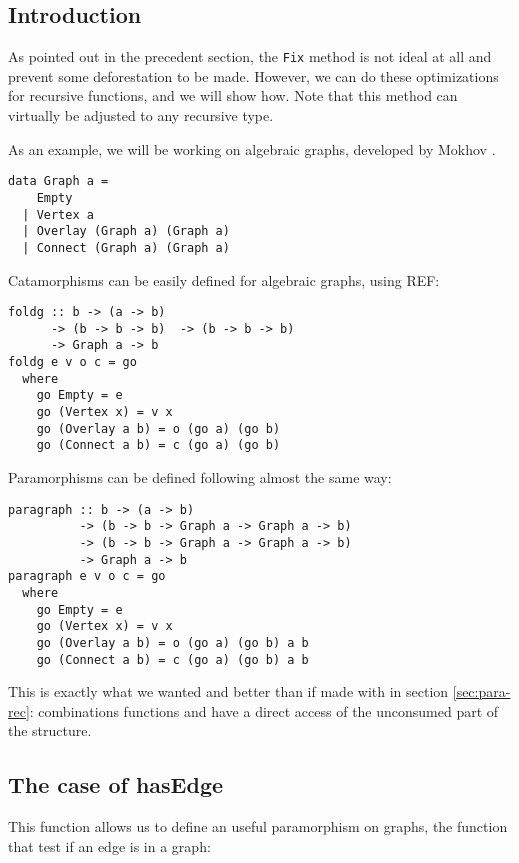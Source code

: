 
\subsection{Introduction}
As pointed out in the precedent section, the \verb|Fix| method is not ideal at all and prevent some deforestation to be made.
However, we can do these optimizations for recursive functions, and we will show how. Note that this method can virtually be adjusted to any recursive type.

As an example, we will be working on algebraic graphs, developed by Mokhov \cite{Mokhov:2017:AGC:3156695.3122956}.
\begin{verbatim}
data Graph a =
    Empty
  | Vertex a
  | Overlay (Graph a) (Graph a)
  | Connect (Graph a) (Graph a)
\end{verbatim}

Catamorphisms can be easily defined for algebraic graphs, using REF:
\begin{verbatim}
foldg :: b -> (a -> b)
      -> (b -> b -> b)  -> (b -> b -> b) 
      -> Graph a -> b
foldg e v o c = go
  where
    go Empty = e
    go (Vertex x) = v x
    go (Overlay a b) = o (go a) (go b)
    go (Connect a b) = c (go a) (go b)
\end{verbatim}

Paramorphisms can be defined following almost the same way:
\begin{verbatim}
paragraph :: b -> (a -> b) 
          -> (b -> b -> Graph a -> Graph a -> b)
          -> (b -> b -> Graph a -> Graph a -> b)
          -> Graph a -> b
paragraph e v o c = go
  where
    go Empty = e
    go (Vertex x) = v x
    go (Overlay a b) = o (go a) (go b) a b
    go (Connect a b) = c (go a) (go b) a b
\end{verbatim}

This is exactly what we wanted and better than if made with  in section \ref{sec:para-rec}: combinations functions  and  have a direct access of the unconsumed part of the structure.

\subsection{The case of hasEdge}

This function allows us to define an useful paramorphism on graphs, the  function that test if an edge is in a graph:

